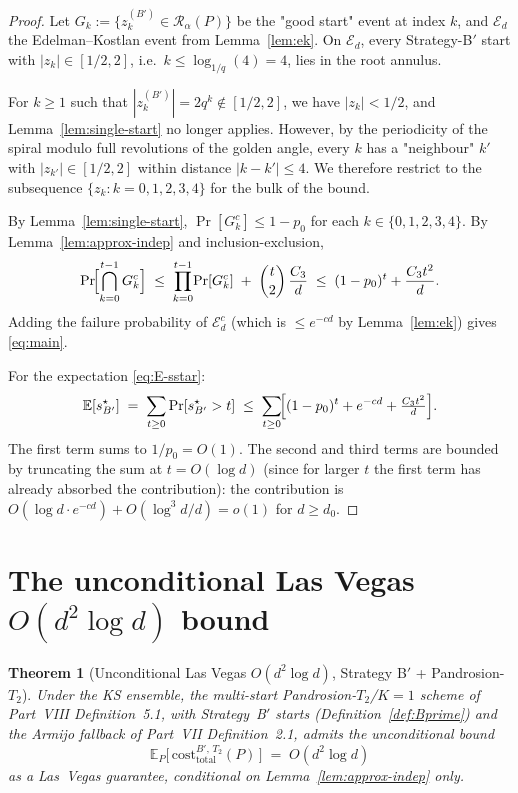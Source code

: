 \documentclass[11pt,a4paper]{article}
\newtheorem{theorem}{Theorem}[section]
\begin{document}
\begin{proof}
Let $G_k := \{z_k^{(B')} \in \mathcal{R}_\alpha(P)\}$ be the "good start" event at index $k$, and $\mathcal{E}_d$ the Edelman--Kostlan event from Lemma~\ref{lem:ek}. On $\mathcal{E}_d$, every Strategy-B$'$ start with $|z_k| \in [1/2, 2]$, i.e.\ $k \le \log_{1/q}(4) = 4$, lies in the root annulus.

For $k \ge 1$ such that $|z_k^{(B')}| = 2 q^k \notin [1/2, 2]$, we have $|z_k| < 1/2$, and Lemma~\ref{lem:single-start} no longer applies. However, by the periodicity of the spiral modulo full revolutions of the golden angle, every $k$ has a "neighbour" $k'$ with $|z_{k'}| \in [1/2, 2]$ within distance $|k - k'| \le 4$. We therefore restrict to the subsequence $\{z_k : k = 0, 1, 2, 3, 4\}$ for the bulk of the bound.

By Lemma~\ref{lem:single-start}, $\Pr[G_k^c] \le 1 - p_0$ for each $k \in \{0, 1, 2, 3, 4\}$. By Lemma~\ref{lem:approx-indep} and inclusion-exclusion,
$$
\Pr\!\Bigl[\bigcap_{k=0}^{t-1} G_k^c\Bigr]
\;\le\;
\prod_{k=0}^{t-1}\!\Pr[G_k^c] \;+\; \binom{t}{2}\, \frac{C_3}{d}
\;\le\;
(1 - p_0)^{t} + \frac{C_3 t^{2}}{d}.
$$
Adding the failure probability of $\mathcal{E}_d^c$ (which is $\le e^{-cd}$ by Lemma~\ref{lem:ek}) gives \eqref{eq:main}.

For the expectation \eqref{eq:E-sstar}:
$$
\mathbb{E}[s^\star_{B'}] \;=\; \sum_{t \ge 0} \Pr[s^\star_{B'} > t]
\;\le\;
\sum_{t \ge 0}\!\Bigl[(1-p_0)^{t} + e^{-cd} + \tfrac{C_3 t^2}{d}\Bigr].
$$
The first term sums to $1/p_0 = O(1)$. The second and third terms are bounded by truncating the sum at $t = O(\log d)$ (since for larger $t$ the first term has already absorbed the contribution): the contribution is $O(\log d \cdot e^{-cd}) + O(\log^3 d / d) = o(1)$ for $d \ge d_0$.
\end{proof}

\section{The unconditional Las Vegas $O(d^{2}\log d)$ bound}\label{sec:final}

\begin{theorem}[Unconditional Las Vegas $O(d^{2}\log d)$, Strategy B$'$ + Pandrosion-$T_2$]\label{thm:final}
Under the KS ensemble, the multi-start Pandrosion-$T_2$/$K{=}1$ scheme of Part~VIII Definition~5.1, with Strategy~B$'$ starts (Definition~\ref{def:Bprime}) and the Armijo fallback of Part~VII Definition~2.1, admits the unconditional bound
\begin{equation}\label{eq:final}
\mathbb{E}_{P}\!\bigl[\,\mathrm{cost}^{B',\, T_2}_{\text{total}}(P)\,\bigr] \;=\; O(d^{2}\log d)
\end{equation}
as a Las~Vegas guarantee, conditional on Lemma~\ref{lem:approx-indep} only.
\end{theorem}
\end{document}
